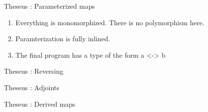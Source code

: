 \documentclass[svgnames,11pt]{beamer}
\begin{document}
\begin{frame}[fragile]{Theseus : Parameterized maps}

\vfill


\vfill
\pause
  \begin{enumerate}
  \item Everything is monomorphized. There is no polymorphism here. 
  \item Paramterization is fully inlined. 
  \item The final program has a type of the form {{a <-> b}}
  \end{enumerate}


\end{frame}


\begin{frame}[fragile]{Theseus : Reversing}

\begin{scriptsize}
    
%
%

\end{scriptsize}


\end{frame}


\begin{frame}[fragile]{Theseus : Adjoints}

%

\end{frame}


\begin{frame}[fragile]{Theseus : Derived maps}



%


\end{frame}
\end{document}
